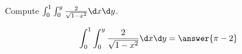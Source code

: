 \documentclass{ximera}
\author{David Guichard \and Neal Koblitz \and H. Jerome Keisler \and Albert Scheller \and Barry Balof \and Mike Wills \and Matthew Carr}
\begin{document}
\begin{exercise}




Compute $\int_{0}^{1}\int_{0}^{y}\frac{2}{\sqrt{1-x^2}}\d x\d y$.
\begin{prompt}
\[
\int_{0}^{1}\int_{0}^{y}\frac{2}{\sqrt{1-x^2}}\d x\d y=\answer{\pi-2}
\]
\end{prompt}



\end{exercise}
\end{document}
